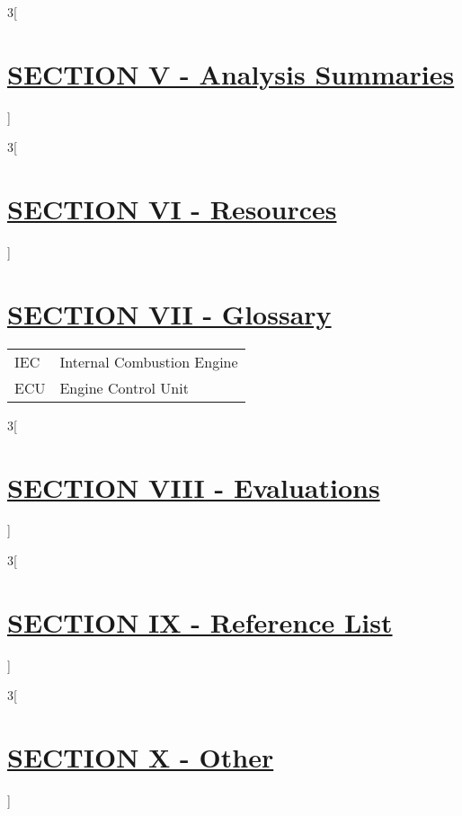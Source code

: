 \documentclass[11pt,a4paper,numbers=noenddot]{scrartcl}
\begin{document}
\newpage
\begin{paracol}{3}[\section{\underline{SECTION V - Analysis Summaries}}]
	
\end{paracol}

\newpage
\begin{paracol}{3}[\section{\underline{SECTION VI - Resources}}]
	
\end{paracol}

\newpage
\section{\underline{SECTION VII - Glossary}}
\begin{tabularx}{\textwidth}{p{3cm} l}
	IEC & Internal Combustion Engine \\
	ECU & Engine Control Unit \\
\end{tabularx}	
	
\newpage
\begin{paracol}{3}[\section{\underline{SECTION VIII - Evaluations}}]
	
\end{paracol}

\newpage
\begin{paracol}{3}[\section{\underline{SECTION IX - Reference List}}]
	
\end{paracol}
\printbibliography

\newpage
\begin{paracol}{3}[\section{\underline{SECTION X - Other}}]
	
\end{paracol}
\end{document}
